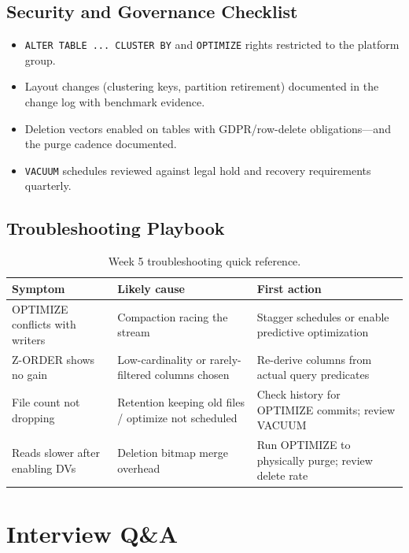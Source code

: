 \subsection{Security and Governance Checklist}
\begin{itemize}
    \item \texttt{ALTER TABLE ... CLUSTER BY} and \texttt{OPTIMIZE} rights restricted to the platform group.
    \item Layout changes (clustering keys, partition retirement) documented in the change log with benchmark evidence.
    \item Deletion vectors enabled on tables with GDPR/row-delete obligations---and the purge cadence documented.
    \item \texttt{VACUUM} schedules reviewed against legal hold and recovery requirements quarterly.
\end{itemize}

\subsection{Troubleshooting Playbook}
\begin{table}[H]
\centering
\small
\begin{tabular}{@{}p{3.6cm}p{4.2cm}p{4.8cm}@{}}
\toprule
\textbf{Symptom} & \textbf{Likely cause} & \textbf{First action} \\
\midrule
OPTIMIZE conflicts with writers & Compaction racing the stream & Stagger schedules or enable predictive optimization \\
Z-ORDER shows no gain & Low-cardinality or rarely-filtered columns chosen & Re-derive columns from actual query predicates \\
File count not dropping & Retention keeping old files / optimize not scheduled & Check history for OPTIMIZE commits; review VACUUM \\
Reads slower after enabling DVs & Deletion bitmap merge overhead & Run OPTIMIZE to physically purge; review delete rate \\
\bottomrule
\end{tabular}
\caption{Week 5 troubleshooting quick reference.}
\label{tab:ch5-trouble}
\end{table}

\section{Interview Q\&A}
